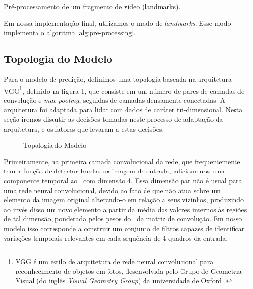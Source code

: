 \begin{algorithm}[H]
    \SetAlgoLined
    \caption{Pré-processamento de um fragmento de vídeo (landmarks).}
    \label{alg:pre-processing}
\end{algorithm}

Em nossa implementação final, utilizamos o modo de \textit{landmarks}. Esse modo implementa o algoritmo \ref{alg:pre-processing}.

\subsection{Topologia do Modelo}
\label{sec:topology}

Para o modelo de predição, definimos uma topologia baseada na arquitetura VGG\footnote{VGG é um estilo de arquitetura de rede neural convolucional para reconhecimento de objetos em fotos, desenvolvida pelo Grupo de Geometria Visual (do inglês \textit{Visual Geometry Group}) da universidade de Oxford \cite{simonyanVeryDeepConvolutional2015}.}, definido na figura \ref{fig:topology_typeA}, que consiste em um número de pares de camadas de convolução e \textit{max pooling}, seguidas de camadas densamente conectadas.
A arquitetura foi adaptada para lidar com dados de caráter tri-dimensional.
Nesta seção iremos discutir as decisões tomadas neste processo de adaptação da arquitetura, e os fatores que levaram a estas decisões.

\begin{figure}[ht]
    \centering
    \resizebox{!}{0.7\textheight}{
        
        }
    \caption{Topologia do Modelo}
    \label{fig:topology_typeA}
\end{figure}

Primeiramente, na primeira camada convolucional da rede, que frequentemente tem a função de detectar bordas na imagem de entrada, adicionamos uma componente temporal ao \ com dimensão 4.
Essa dimensão par não é usual para uma rede neural convolucional, devido ao fato de que não atua sobre um elemento da imagem original alterando-o em relação a seus vizinhos, produzindo ao invés disso um novo elemento a partir da média dos valores internos às regiões de tal dimensão, ponderada pelos pesos do \ da matriz de convolução.
Em nosso modelo isso corresponde a construir um conjunto de filtros capazes de identificar variações temporais relevantes em cada sequência de 4 quadros da entrada.

